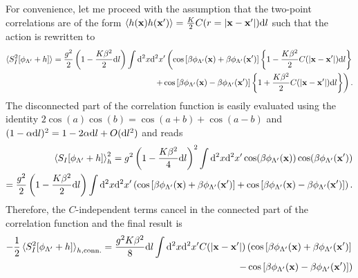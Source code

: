 For convenience, let me proceed with the assumption that the two-point correlations are of the form $\braket{h({\bf x})h({\bf x'})} = \frac K2 C(r=|{\bf x}-{\bf x'}|)\mathrm d l$ such that the action is rewritten to
\begin{align}
    \braket{S^2_I[\phi_{\Lambda'}+h]}=\frac{g^2}2\left( 1 - \frac{K\beta^2}2\mathrm d l \right)\int\mathrm d^2x\mathrm d^2x'
    \left(
        \cos\left[ \beta\phi_{\Lambda'}({\bf x})+\beta\phi_{\Lambda'}({\bf x'}) \right]\left\{ 1-\frac{K\beta^2}2C(|{\bf x}-{\bf x'}|)\mathrm d l \right\}
        \right.\\
        \left.+
        \cos\left[ \beta\phi_{\Lambda'}({\bf x})-\beta\phi_{\Lambda'}({\bf x'}) \right]\left\{ 1+\frac{K\beta^2}2C(|{\bf x}-{\bf x'}|)\mathrm d l \right\}
    \right).
\end{align}
The disconnected part of the correlation function is easily evaluated using the identity $2\cos(a)\cos(b)=\cos(a+b)+\cos(a-b)$ and $(1-\alpha\mathrm d l)^2 = 1-2\alpha\mathrm d l + O(\mathrm d l^2)$ and reads
\begin{align}
    \braket{S_I[\phi_{\Lambda'}+h]}_h^2
    = g^2\left( 1 - \frac{K\beta^2}4\mathrm d l \right)^2\int\mathrm d^2x\mathrm d^2x'\cos(\beta \phi_{\Lambda'}({\bf x}))\cos(\beta \phi_{\Lambda'}({\bf x'}))
    \\
    = \frac{g^2}2\left( 1 - \frac{K\beta^2}2\mathrm d l \right)\int\mathrm d^2x\mathrm d^2x'
        \left(
            \cos\left[ \beta \phi_{\Lambda'}({\bf x})+\beta \phi_{\Lambda'}({\bf x'}) \right]
            +
            \cos\left[ \beta \phi_{\Lambda'}({\bf x})-\beta \phi_{\Lambda'}({\bf x'}) \right]
        \right).
\end{align}
Therefore, the $C$-independent terms cancel in the connected part of the correlation function and the final result is
\begin{align}
    -\frac12\braket{S^2_I[\phi_{\Lambda'}+h]}_{h,{\rm conn.}} = \frac{g^2K\beta^2}8\mathrm d l\int\mathrm d^2x\mathrm d^2x'
    C(|{\bf x}-{\bf x'}|)
    \left(
        \cos\left[ \beta\phi_{\Lambda'}({\bf x})+\beta\phi_{\Lambda'}({\bf x'}) \right]
        \right.
        \\
        \left.-
        \cos\left[ \beta\phi_{\Lambda'}({\bf x})-\beta\phi_{\Lambda'}({\bf x'}) \right]
    \right)
\end{align}
